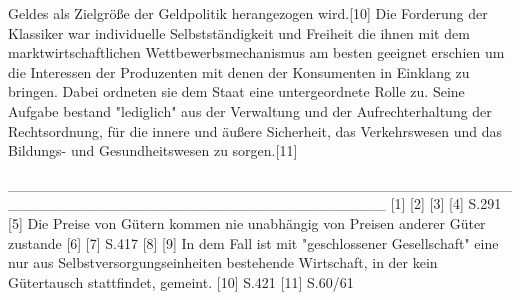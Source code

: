 Geldes als Zielgröße der Geldpolitik herangezogen wird.[10] Die Forderung der Klassiker war individuelle Selbstständigkeit und Freiheit die ihnen mit dem marktwirtschaftlichen Wettbewerbsmechanismus am besten geeignet erschien um die Interessen der Produzenten mit denen der Konsumenten in Einklang zu bringen. Dabei ordneten sie dem Staat eine untergeordnete Rolle zu. Seine Aufgabe bestand "lediglich" aus der Verwaltung und der Aufrechterhaltung der Rechtsordnung, für die innere und äußere Sicherheit, das Verkehrswesen und das Bildungs- und Gesundheitswesen zu sorgen.[11]


\citep[S.11]{Basseler2010}
____________________________________________________________________________________
[1] \citep[S.11]{bombach1981theorie}
[2] \citep[S.161]{bombach1981theorie}
[3] \citep[S.137]{bombach1981theorie}
[4] \citep[S.11]{Basseler2010} S.291
[5] Die Preise von Gütern kommen nie unabhängig von Preisen anderer Güter zustande
[6] \citep[S.138]{bombach1981theorie}
[7] \citep[S.11]{Basseler2010} S.417
[8] \citep[S.53]{bombach1981theorie}
[9] In dem Fall ist mit "geschlossener Gesellschaft" eine nur aus Selbstversorgungseinheiten bestehende Wirtschaft, in der kein Gütertausch stattfindet, gemeint.
[10] \citep[S.11]{Basseler2010} S.421
[11] \citep[S.11]{Basseler2010} S.60/61

